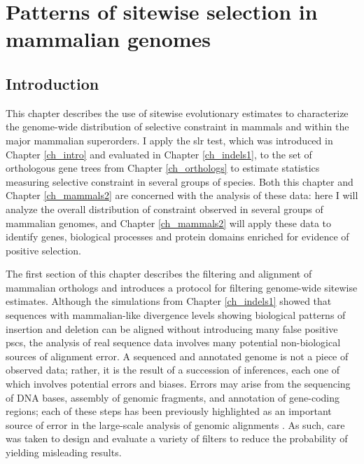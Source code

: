 \chapter{Patterns of sitewise selection in mammalian genomes}
\label{ch_mammals1}
\acresetall

\section{Introduction}

This chapter describes the use of sitewise evolutionary estimates to
characterize the genome-wide distribution of selective constraint in
mammals and within the major mammalian superorders. I apply the
\ac{slr} test, which was introduced in Chapter \ref{ch_intro} and
evaluated in Chapter \ref{ch_indels1}, to the set of orthologous gene
trees from Chapter \ref{ch_orthologs} to estimate statistics measuring
\sw selective constraint in several groups of \mammln species. Both
this chapter and Chapter \ref{ch_mammals2} are concerned with the
analysis of these \sw data: here I will analyze the overall
distribution of constraint observed in several groups of mammalian
genomes, and Chapter \ref{ch_mammals2} will apply these \sw data to
identify genes, biological processes and protein domains enriched for
evidence of positive selection.

The first section of this chapter describes the filtering and
alignment of mammalian orthologs and introduces a protocol for
filtering genome-wide sitewise estimates. Although the simulations
from Chapter \ref{ch_indels1} showed that sequences with
mammalian-like divergence levels showing biological patterns of
insertion and deletion can be aligned without introducing many false
positive \acp{psc}, the analysis of real sequence data involves many
potential non-biological sources of alignment error. A sequenced and
annotated genome is not a piece of observed data; rather, it is the
result of a succession of inferences, each one of which involves
potential errors and biases. Errors may arise from the sequencing of
DNA bases, assembly of genomic fragments, and annotation of
gene-coding regions; each of these steps has been previously
highlighted as an important source of error in the large-scale
analysis of genomic alignments \citep{TODO}. As such, care was taken
to design and evaluate a variety of filters to reduce the probability
of yielding misleading results.

